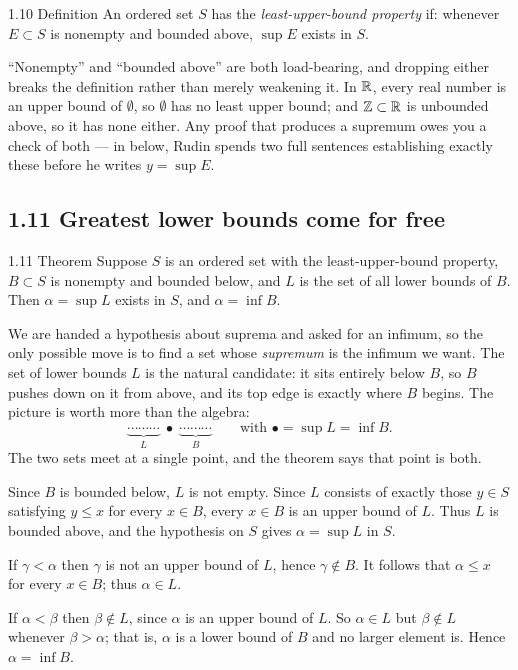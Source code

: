 \documentclass[11pt,twoside]{article}
\begin{document}
\begin{rudinbox}{\textsc{1.10} Definition}
An ordered set $S$ has the \emph{least-upper-bound property} if: whenever
$E \subset S$ is nonempty and bounded above, $\sup E$ exists in $S$.
\end{rudinbox}

\begin{pitfall}
``Nonempty'' and ``bounded above'' are both load-bearing, and dropping either
breaks the definition rather than merely weakening it. In $\mathbb{R}$, every real number
is an upper bound of $\emptyset$, so $\emptyset$ has no least upper bound; and
$\mathbb{Z} \subset \mathbb{R}$ is unbounded above, so it has none either. Any proof that
produces a supremum owes you a check of both --- in  below, Rudin
spends two full sentences establishing exactly these before he writes
$y = \sup E$.
\end{pitfall}

\subsection*{1.11 \; Greatest lower bounds come for free}

\begin{rudinbox}{\textsc{1.11} Theorem}
Suppose $S$ is an ordered set with the least-upper-bound property, $B \subset S$
is nonempty and bounded below, and $L$ is the set of all lower bounds of $B$.
Then $\alpha = \sup L$ exists in $S$, and $\alpha = \inf B$.
\end{rudinbox}

\begin{unpack}
We are handed a hypothesis about suprema and asked for an infimum, so the only
possible move is to find a set whose \emph{supremum} is the infimum we want. The
set of lower bounds $L$ is the natural candidate: it sits entirely below $B$, so
$B$ pushes down on it from above, and its top edge is exactly where $B$ begins.
The picture is worth more than the algebra:
\[
  \underbrace{\cdots\cdots\cdots}_{\textstyle L}
  \;\bullet\;
  \underbrace{\cdots\cdots\cdots}_{\textstyle B}
  \qquad\text{with } \bullet = \sup L = \inf B .
\]
The two sets meet at a single point, and the theorem says that point is both.
\end{unpack}

\begin{rproof}
Since $B$ is bounded below, $L$ is not empty. Since $L$ consists of exactly those
$y \in S$ satisfying $y \le x$ for every $x \in B$, every $x \in B$ is an upper
bound of $L$. Thus $L$ is bounded above, and the hypothesis on $S$ gives
$\alpha = \sup L$ in $S$.

If $\gamma < \alpha$ then $\gamma$ is not an upper bound of $L$, hence
$\gamma \notin B$. It follows that $\alpha \le x$ for every $x \in B$; thus
$\alpha \in L$.

If $\alpha < \beta$ then $\beta \notin L$, since $\alpha$ is an upper bound of
$L$. So $\alpha \in L$ but $\beta \notin L$ whenever $\beta > \alpha$; that is,
$\alpha$ is a lower bound of $B$ and no larger element is. Hence
$\alpha = \inf B$.
\end{rproof}
\end{document}
